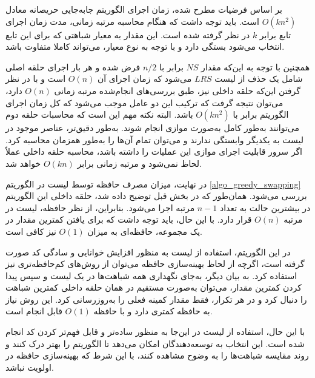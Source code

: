 بر اساس فرضیات مطرح شده، زمان اجرای الگوریتم جابه‌جایی حریصانه معادل \( O(kn^2) \) است.
باید توجه داشت که هنگام محاسبه مرتبه زمانی، مدت زمان اجرای تابع  برابر \( k \) در نظر گرفته شده است. این مقدار به معیار شباهتی که برای این تابع انتخاب می‌شود بستگی دارد و با توجه به نوع معیار، می‌تواند کاملا متفاوت باشد.


همچنین با توجه به این‌که مقدار \( NS \) برابر با \( n/2 \) فرض شده و هر بار اجرای حلقه اصلی شامل یک حذف از لیست \( LRS \) می‌شود که زمان اجرای آن \( O(n) \) است و با در نظر گرفتن این‌که حلقه داخلی نیز، طبق بررسی‌های انجام‌شده
مرتبه زمانی \( O(n) \) دارد، می‌توان نتیجه گرفت که ترکیب این دو عامل موجب می‌شود که کل زمان اجرای الگوریتم برابر با \( O(kn^2) \) باشد.
البته نکته مهم این است که محاسبات حلقه دوم می‌توانند به‌طور کامل به‌صورت موازی انجام شوند. به‌طور دقیق‌تر، عناصر موجود در لیست 
به یکدیگر وابستگی ندارند و می‌توان تمام آن‌ها را به‌طور همزمان محاسبه کرد. اگر سرور قابلیت اجرای موازی این عملیات را داشته باشد، محاسبه حلقه داخلی عملاً لحاظ نمی‌شود و مرتبه زمانی برابر
\( O(kn) \) 
خواهد شد. 


در نهایت، میزان مصرف حافظه توسط لیست
در الگوریتم
 \ref{algo_greedy_swapping} 
بررسی می‌شود. همان‌طور که در بخش قبل توضیح داده شد، حلقه داخلی این الگوریتم در بیشترین حالت به تعداد \(n-1\) مرتبه اجرا می‌شود. بنابراین، از نظر حافظه، لیست
در مرتبه \(O(n)\) قرار دارد. با این حال، باید توجه داشت که برای یافتن کمترین مقدار در یک مجموعه، حافظه‌ای به میزان \(O(1)\) نیز کافی است. 

در این الگوریتم، استفاده از لیست
به منظور افزایش خوانایی و سادگی کد صورت گرفته است، اگرچه از لحاظ بهینه‌سازی حافظه می‌توان از روش‌های کم‌حافظه‌تری نیز استفاده کرد. به بیان دیگر، به‌جای نگهداری همه شباهت‌ها در یک لیست و سپس پیدا کردن کمترین مقدار، می‌توان به‌صورت مستقیم در همان حلقه داخلی کمترین شباهت را دنبال کرد و در هر تکرار، فقط مقدار کمینه فعلی را به‌روزرسانی کرد. این روش نیاز به حافظه کمتری دارد و با حافظه \(O(1)\) قابل انجام است.

با این حال، استفاده از لیست
در این‌جا به منظور ساده‌تر و قابل فهم‌تر کردن کد انجام شده است. این انتخاب به توسعه‌دهندگان امکان می‌دهد تا الگوریتم را بهتر درک کنند و روند مقایسه شباهت‌ها را به وضوح مشاهده کنند، با این شرط که بهینه‌سازی حافظه در اولویت نباشد.




